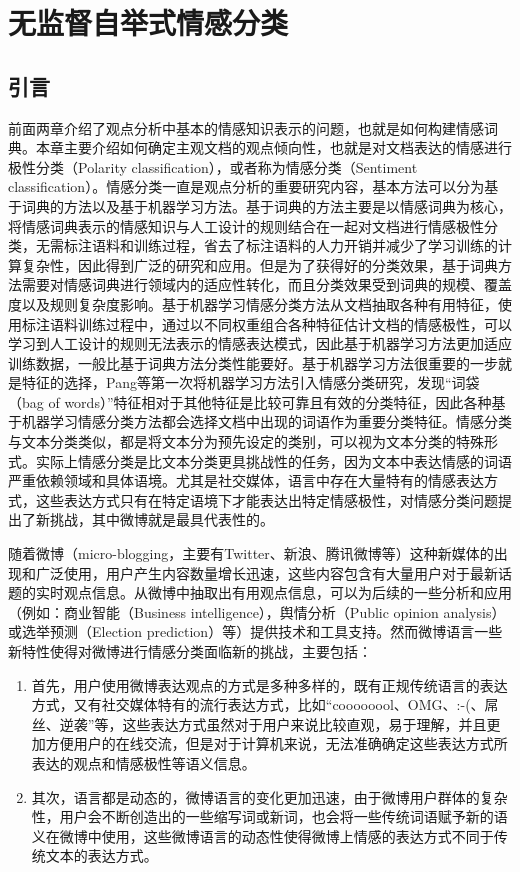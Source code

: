 \chapter{无监督自举式情感分类}
\label{ch4}

\section{引言}
\label{ch4_intr}
前面两章介绍了观点分析中基本的情感知识表示的问题，也就是如何构建情感词典。本章主要介绍如何确定主观文档的观点倾向性，也就是对文档表达的情感进行极性分类（Polarity classification），或者称为情感分类（Sentiment classification）。情感分类一直是观点分析的重要研究内容，基本方法可以分为基于词典的方法以及基于机器学习方法。基于词典的方法主要是以情感词典为核心，将情感词典表示的情感知识与人工设计的规则结合在一起对文档进行情感极性分类，无需标注语料和训练过程，省去了标注语料的人力开销并减少了学习训练的计算复杂性，因此得到广泛的研究和应用。但是为了获得好的分类效果，基于词典方法需要对情感词典进行领域内的适应性转化，而且分类效果受到词典的规模、覆盖度以及规则复杂度影响。基于机器学习情感分类方法从文档抽取各种有用特征，使用标注语料训练过程中，通过以不同权重组合各种特征估计文档的情感极性，可以学习到人工设计的规则无法表示的情感表达模式，因此基于机器学习方法更加适应训练数据，一般比基于词典方法分类性能要好。基于机器学习方法很重要的一步就是特征的选择，Pang等第一次将机器学习方法引入情感分类研究，发现“词袋（bag of words）”特征相对于其他特征是比较可靠且有效的分类特征，因此各种基于机器学习情感分类方法都会选择文档中出现的词语作为重要分类特征。情感分类与文本分类类似，都是将文本分为预先设定的类别，可以视为文本分类的特殊形式。实际上情感分类是比文本分类更具挑战性的任务，因为文本中表达情感的词语严重依赖领域和具体语境。尤其是社交媒体，语言中存在大量特有的情感表达方式，这些表达方式只有在特定语境下才能表达出特定情感极性，对情感分类问题提出了新挑战，其中微博就是最具代表性的。

随着微博（micro-blogging，主要有Twitter、新浪、腾讯微博等）这种新媒体的出现和广泛使用，用户产生内容数量增长迅速，这些内容包含有大量用户对于最新话题的实时观点信息。从微博中抽取出有用观点信息，可以为后续的一些分析和应用（例如：商业智能（Business intelligence），舆情分析（Public opinion analysis）或选举预测（Election prediction）等）提供技术和工具支持。然而微博语言一些新特性使得对微博进行情感分类面临新的挑战，主要包括：
\begin{enumerate}
\item 首先，用户使用微博表达观点的方式是多种多样的，既有正规传统语言的表达方式，又有社交媒体特有的流行表达方式，比如“coooooool、OMG、:-(、屌丝、逆袭”等，这些表达方式虽然对于用户来说比较直观，易于理解，并且更加方便用户的在线交流，但是对于计算机来说，无法准确确定这些表达方式所表达的观点和情感极性等语义信息。
\item 其次，语言都是动态的，微博语言的变化更加迅速，由于微博用户群体的复杂性，用户会不断创造出的一些缩写词或新词，也会将一些传统词语赋予新的语义在微博中使用，这些微博语言的动态性使得微博上情感的表达方式不同于传统文本的表达方式。
\end{enumerate}

